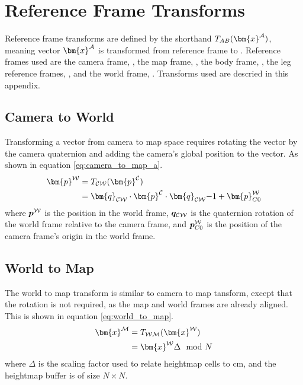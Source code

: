 \chapter{Reference Frame Transforms} \label{app:transforms}
    Reference frame transforms are defined by the shorthand \(\transframe{\bm{x}\inrefframe{A}}{A}{B}\), meaning vector \(\bm{x}\inrefframe{A}\) is transformed from reference frame  to . Reference frames used are the camera frame, , the map frame, , the body frame, , the leg reference frames, , and the world frame, . Transforms used are descried in this appendix.

    \section{Camera to World}
        Transforming a vector from camera to map space requires rotating the vector by the camera quaternion and adding the camera's global position to the vector. As shown in equation \ref{eq:camera_to_map_a}.
        \begin{align} \label{eq:camera_to_map_a}
            \begin{split}
                \bm{p}\inrefframe{\fworld} &= \transframe{\bm{p}\inrefframe{\fcamera}}{\fcamera}{\fworld}\\ 
                &= \bm{q}_{\fcamera\fworld} \cdot \bm{p}\inrefframe{\fcamera} \cdot \bm{q}_{\fcamera\fworld}{-1} + \bm{p}\inrefframe{\fworld}_{C0}
            \end{split}
        \end{align}
        where \(\boldsymbol{p}\inrefframe{\fworld}\) is the position in the world frame, \(\boldsymbol{q}_{\fcamera\fworld}\) is the quaternion rotation of the world frame relative to the camera frame, and \(\boldsymbol{p}\inrefframe{\fworld}_{C0}\) is the position of the camera frame's origin in the world frame.
    
    \newpage
    \section{World to Map}
        The world to map transform is similar to camera to map tansform, except that the rotation is not required, as the map and world frames are already aligned.
        This is shown in equation \ref{eq:world_to_map}.
        \begin{align}\label{eq:world_to_map}
        \begin{split}
            \bm{x}\inrefframe{\fmap} &= \transframe{\bm{x}\inrefframe{\fworld}}{\fworld}{\fmap} \\
            &= \bm{x}\inrefframe{\fworld}\Delta \mod{N}
        \end{split}
        \end{align}
        where \(\Delta\) is the scaling factor used to relate heightmap cells to cm, and the heightmap buffer is of size \(N\times N\).
